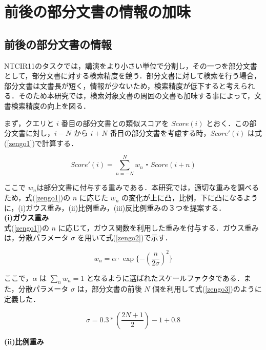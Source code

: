 \chapter{前後の部分文書の情報の加味}

\section{前後の部分文書の情報}
NTCIR11のタスクでは，講演をより小さい単位で分割し，その一つを部分文書として，部分文書に対する検索精度を競う．部分文書に対して検索を行う場合，部分文書は文書長が短く，情報が少ないため，検索精度が低下すると考えられる．そのため本研究では，検索対象文書の周囲の文書も加味する事によって，文書検索精度の向上を図る．


まず，クエリと $i$ 番目の部分文書との類似スコアを $Score(i)$ とおく．この部分文書に対し，$i-N$ から $i+N$ 番目の部分文書を考慮する時，$ Score'(i)$ は式(\ref{zengo1})で計算する．

\begin{equation}
    Score'(i) = \sum_{n=-N}^N w_n・Score(i + n) 
    \label{zengo1}
\end{equation}

ここで $w_n$は部分文書に付与する重みである．本研究では，適切な重みを調べるため，式(\ref{zengo1})の $n$ に応じた $w_n$ の変化が上に凸，比例，下に凸になるように，(i)ガウス重み，(ii)比例重み，(iii)反比例重みの３つを提案する．\\

{\bf(i)ガウス重み} \\

式(\ref{zengo1})の $n$ に応じて，ガウス関数を利用した重みを付与する．ガウス重みは，分散パラメータ $\sigma$ を用いて式(\ref{zengo2})で示す．

\begin{equation}
    w_n = \alpha⋅\exp⁡\{-(\frac{n}{2\sigma})^2\}
    \label{zengo2}
\end{equation}

ここで，$\alpha$ は $\sum_n w_n = 1$ となるように選ばれたスケールファクタである．また，分散パラメータ $\sigma$ は，部分文書の前後 $N$ 個を利用して式(\ref{zengo3})のように定義した．

\begin{equation}
    \sigma = 0.3 * (\frac{2N+1}{2}) - 1 + 0.8
    \label{zengo3}
\end{equation}

{\bf(ii)比例重み} \\

